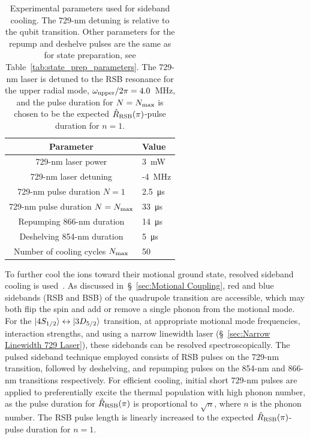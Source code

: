    \begin{table}
        \begin{center}
        \begin{tabular}{|c|l|}
            \hline
            Parameter & Value \\
            \hline
            729-nm laser power & 3~\unit{\mW}\\
            729-nm laser detuning & -4~\unit{\MHz}\\
            729-nm pulse duration $N = 1$ & 2.5~\unit{\us}\\
            729-nm pulse duration $N = N_{\rm max}$ & 33~\unit{\us}  \\
            Repumping 866-nm duration & 14~\unit{\us}\\
            Deshelving 854-nm duration & 5~\unit{\us}\\
            Number of cooling cycles $N_{\rm max}$ & 50\\
            \hline
        \end{tabular}
        \end{center}
        \caption{
            Experimental parameters used for sideband cooling. 
            The 729-nm detuning is relative to the qubit transition. Other parameters for the repump and deshelve pulses are the same as for state preparation, see Table~\ref{tab:state_prep_parameters}. The 729-nm laser is detuned to the RSB resonance for the upper radial mode, $\omega_{\rm upper}/2\pi = 4.0$~\unit{\MHz}, and the pulse duration for $N=N_{\rm max}$ is chosen to be the expected $\hat R_{\rm RSB}(\pi)$-pulse duration for $n=1$. 
            }
        \label{tab:sbc_parameters}
    \end{table}

    To further cool the ions toward their motional ground state, resolved
    sideband cooling is used~\cite{diedrich_laser_1989}. As discussed in~\S~\ref{sec:Motional Coupling}, red and blue sidebands (RSB and BSB) of the quadrupole transition are accessible, which may both flip the spin and add or remove a single phonon from the motional mode. For the $\ket{4S_{1/2}} \leftrightarrow
    \ket{3D_{5/2}}$ transition, at appropriate motional mode
    frequencies, interaction strengths, and using a narrow linewidth laser (\S~\ref{sec:Narrow Linewidth 729 Laser}), these sidebands can be resolved spectroscopically. The pulsed
    sideband technique employed consists of RSB pulses on the 729-nm transition, followed by
    deshelving, and repumping pulses on the 854-nm and 866-nm transitions
    respectively. 
    For efficient cooling, initial short 729-nm pulses are applied to preferentially excite the thermal population with high phonon number, as the pulse duration for $\hat R_{\rm RSB}(\pi)$ is proportional to $\sqrt{n}$, where $n$ is the phonon number.  The RSB pulse length is linearly increased to the expected $\hat R_{\rm RSB}(\pi)$-pulse duration for $n=1$.

